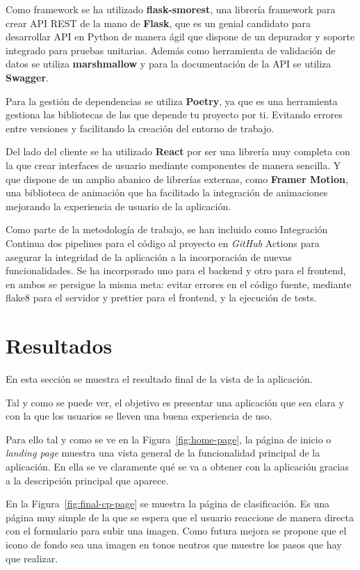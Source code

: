 Como framework se ha utilizado \textbf{flask-smorest}, una librería framework para crear API REST de la mano de
\textbf{Flask}, que es un genial candidato para desarrollar API en Python de manera ágil que dispone de un depurador
y soporte integrado para pruebas unitarias.
Además como herramienta de validación de datos se utiliza \textbf{marshmallow} y para la documentación de la API se utiliza
\textbf{Swagger}.

Para la gestión de dependencias se utiliza \textbf{Poetry}, ya que es una herramienta gestiona las bibliotecas de las que depende
tu proyecto por ti.
Evitando errores entre versiones y facilitando la creación del entorno de trabajo.

Del lado del cliente se ha utilizado \textbf{React} por ser una librería muy completa con la que crear interfaces de usuario
mediante componentes de manera sencilla.
Y que dispone de un amplio abanico de librerías externas, como \textbf{Framer Motion}, una biblioteca de animación que ha
facilitado la integración de animaciones mejorando la experiencia de usuario de la aplicación.

Como parte de la metodología de trabajo, se han incluido como Integración Continua dos pipelines para el código al
proyecto en \textit{GitHub} Actions para asegurar la integridad de la aplicación a la incorporación de nuevas funcionalidades.
Se ha incorporado uno para el backend y otro para el frontend, en ambos se persigue la misma meta: evitar errores en
el código fuente, mediante flake8 para el servidor y prettier para el frontend, y la ejecución de tests.


\section{Resultados}\label{sec:resultados}

En esta sección se muestra el resultado final de la vista de la aplicación.

Tal y como se puede ver, el objetivo es presentar una aplicación que sea clara y con la que los usuarios se lleven una
buena experiencia de uso.

Para ello tal y como se ve en la Figura~\ref{fig:home-page}, la página de inicio o \textit{landing page} muestra una vista
general de la funcionalidad principal de la aplicación.
En ella se ve claramente qué se va a obtener con la aplicación gracias a la descripción principal que aparece.

En la Figura~\ref{fig:final-cp-page} se muestra la página de clasificación.
Es una página muy simple de la que se espera que el usuario reaccione de manera directa con el formulario para subir
una imagen.
Como futura mejora se propone que el icono de fondo sea una imagen en tonos neutros que muestre los pasos que hay que
realizar.

